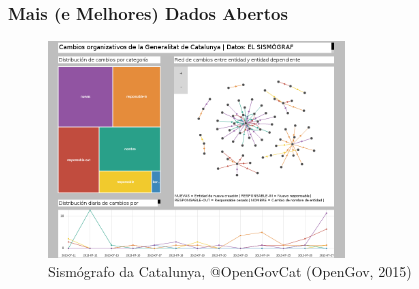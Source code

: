 \documentclass[hyperref={pdfpagelabels=true}]{beamer}
\begin{document}



\begin{frame}
\frametitle{Mais (e Melhores) Dados Abertos}

          
        
        
       \begin{figure}   
            \includegraphics[width=0.7\textwidth]{sism.png}
            \caption{Sism\'{o}grafo da Catalunya, @OpenGovCat (OpenGov, 2015)}         
        \end{figure} 
 
\end{frame}
\end{document}
